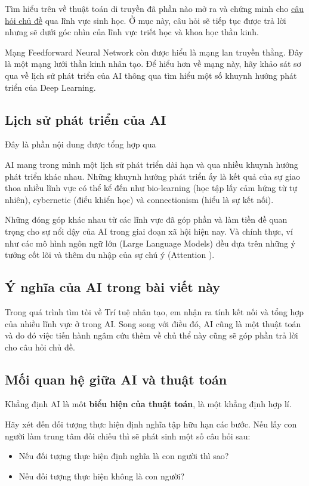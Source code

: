 Tìm hiểu trên về thuật toán di truyền đã phần nào mở ra và chứng minh cho \hyperlink{main_question}{câu hỏi chủ đề} qua lĩnh vực sinh học. Ở mục này, câu hỏi sẽ tiếp tục được trả lời nhưng sẽ dưới góc nhìn của lĩnh vực triết học và khoa học thần kinh.

Mạng Feedforward Neural Network còn được hiểu là mạng lan truyền thẳng. Đây là một mạng lưới thần kinh nhân tạo. Để hiểu hơn về mạng này, hãy khảo sát sơ qua về lịch sử phát triển của AI thông qua tìm hiểu một số khuynh hướng phát triển của Deep Learning.

\subsection{Lịch sử phát triển của AI}
	Đây là phần nội dung được tổng hợp qua \cite[Chương 1, mục 1.2.1, trang 12--26]{Goodfellow-et-al-2016}
	
	AI mang trong mình một lịch sử phát triển dài hạn và qua nhiều khuynh hướng phát triển khác nhau. Những khuynh hướng phát triển ấy là kết quả của sự giao thoa nhiều lĩnh vực có thể kể đến như bio-learning (học tập lấy cảm hứng từ tự nhiên), cybernetic (điểu khiển học) và connectionism (hiểu là sự kết nối). 
	
	Những đóng góp khác nhau từ các lĩnh vực đã góp phần và làm tiền đề quan trọng cho sự nổi dậy của AI trong giai đoạn xã hội hiện nay. Và chính thực, ví như các mô hình ngôn ngữ lớn (Large Language Models) đều dựa trên những ý tưởng cốt lõi và thêm du nhập của sự chú ý (Attention \cite{vaswani2023attentionneed}).

\subsection{Ý nghĩa của AI trong bài viết này}
	Trong quá trình tìm tòi về Trí tuệ nhân tạo, em nhận ra tính kết nối và tổng hợp của nhiều lĩnh vực ở trong AI. Song song với điều đó, AI cũng là một thuật toán và do đó việc tiến hành ngâm cứu thêm về chủ thể này cũng sẽ góp phần trả lời cho câu hỏi chủ đề.
	
\subsection{Mối quan hệ giữa AI và thuật toán}
	Khẳng định AI là môt \textbf{biểu hiện của thuật toán}, là một khẳng định hợp lí. 
	
	Hãy xét đến đối tượng thực hiện định nghĩa tập hữu hạn các bước. Nếu lấy con người làm trung tâm đối chiếu thì sẽ phát sinh một số câu hỏi sau:
	\begin{itemize}
		\item Nếu đối tượng thực hiện định nghĩa là con người thì sao?
		\item Nếu đối tượng thực hiện không là con người?
	\end{itemize} 
	

